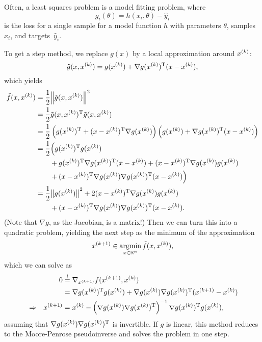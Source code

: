 \documentclass{article}
\begin{document}
Often, a least squares problem is a model fitting problem, where
\begin{equation*}
  g_i(\theta) = h(x_i, \theta) - \hat{y}_i
\end{equation*}
is the loss for a single sample for a model function \(h\) with parameters \(\theta\), samples
\(x_i\), and targets~\(\hat{y}_i\).


\label{s:gauss-newton-method}

To get a step method, we replace \(g(x)\) by a local approximation around \(\kth{x}\):
\begin{equation*}
  \tilde{g}(x, \kth{x}) = g(\kth{x}) + \T{\nabla g(\kth{x})}(x - \kth{x}),
\end{equation*}
which yields
\begin{align*}
  \tilde{f}(x, \kth{x})
    &= \frac{1}{2} \enVert{\tilde{g}(x, \kth{x})}^2 \\
    &= \frac{1}{2} \T{\tilde{g}(x, \kth{x})}\tilde{g}(x, \kth{x}) \\
    &= \frac{1}{2} \left( \T{g(\kth{x})} + \T{(x - \kth{x})}\nabla g(\kth{x}) \right)
      \left( g(\kth{x}) + \T{\nabla g(\kth{x})}(x - \kth{x}) \right) \\
    &= \frac{1}{2} \Big( \T{g(\kth{x})}g(\kth{x}) \\
    &\qquad + \T{g(\kth{x})}\T{\nabla g(\kth{x})}(x - \kth{x}) + \T{(x - \kth{x})}\nabla
      g(\kth{x})g(\kth{x}) \\
    &\qquad + \T{(x - \kth{x})}\nabla g(\kth{x})\T{\nabla g(\kth{x})}(x - \kth{x}) \Big) \\
    &= \frac{1}{2} \enVert[1]{g(\kth{x})}^2 + 2\T{(x - \kth{x})} \nabla g(\kth{x})g(\kth{x}) \\
    &\qquad + \T{(x - \kth{x})} \nabla g(\kth{x})\T{\nabla g(\kth{x})}(x - \kth{x}).
\end{align*}
(Note that \(\nabla g\), as the Jacobian, is a matrix!)  Then we can turn this into a quadratic
problem, yielding the next step as the minimum of the approximation
\begin{equation*}
  \kth[k+1]{x} \in \argmin_{x \in \RR^n} \tilde{f}(x, \kth{x}),
\end{equation*}
which we can solve as
\begin{align*}
  & & 0 &\overset{!}{=} \nabla_{\kth[k+1]{x}} f(\kth[k+1]{x}, \kth{x}) \\
  & & &= \T{\nabla g(\kth{x})} g(\kth{x})
        + \nabla g(\kth{x})\T{\nabla g(\kth{x})} (\kth[k+1]{x} - \kth{x}) \\
  &\Rightarrow  & \kth[k+1]{x} &= \kth{x} - \left(\nabla g(\kth{x}) \T{\nabla
                 g(\kth{x})}\right)^{-1}
                 \T{\nabla g(\kth{x})} g(\kth{x}),
\end{align*}
assuming that \(\nabla g(\kth{x}) \T{\nabla g(\kth{x})}\) is invertible.  If \(g\) is linear, this
method reduces to the Moore-Penrose pseudoinverse and solves the problem in one step.
\end{document}
